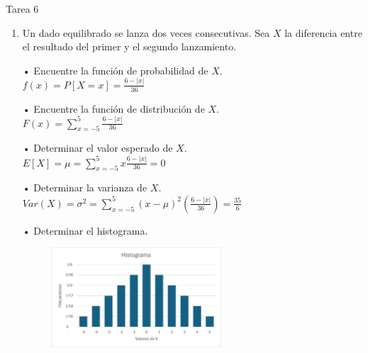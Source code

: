 \documentclass[a4paper, 12pt]{article}
\newcommand{\Aspace}{0.2cm}
\begin{document}
\newpage
\begin{center}
    { \LARGE Tarea 6}
\end{center}

\begin{enumerate}
    \item Un dado equilibrado se lanza dos veces consecutivas. Sea $X$ la diferencia entre el resultado del primer y el segundo lanzamiento.
    \vspace{\Aspace} \par
    • Encuentre la función de probabilidad de $X$.
    \\ { \color{azul} $f(x) = P[X = x] = \frac{6 - |x|}{36}$ }

    \vspace{\Aspace} \par
    • Encuentre la función de distribución de $X$.
    \\ { \color{azul} $F(x) = \sum\limits_{x = -5}^{5} \frac{6 - |x|}{36}$ }

    \vspace{\Aspace} \par
    • Determinar el valor esperado de $X$.
    \\ { \color{azul} $E[X] = \mu = \sum\limits_{x = -5}^{5} x\frac{6 - |x|}{36} = 0$ }

    \vspace{\Aspace} \par
    • Determinar la varianza de $X$.
    \\ { \color{azul} $Var(X) = \sigma^{2} = \sum\limits_{x = -5}^{5} (x - \mu)^{2} (\frac{6 - |x|}{36}) = \frac{35}{6}$ }

    \vspace{\Aspace} \par
    • Determinar el histograma.
    \begin{figure}[h]
        \centering
        \includegraphics[width=0.6\textwidth]{./Assets/HistogramaT6P1.png}
    \end{figure}


\end{enumerate}
\end{document}
